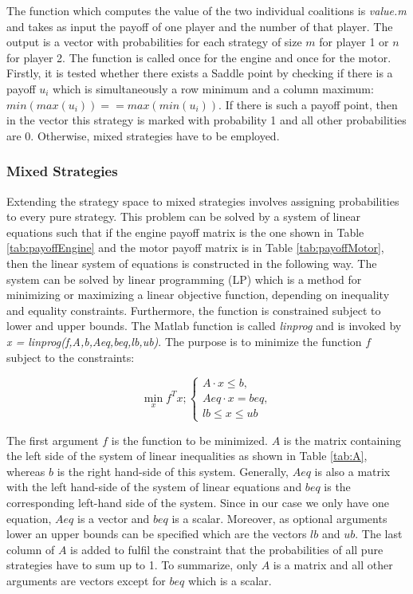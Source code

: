 The function which computes the value of the two individual coalitions is \textit{value.m} and takes as input the payoff of one player and the number of that player. The output is a vector with probabilities for each strategy of size $m$ for player 1 or $n$ for player 2. The function is called once for the engine and once for the motor. Firstly, it is tested whether there exists a Saddle point by checking if there is a payoff $u_i$ which is simultaneously a row minimum and a column maximum: $min(max(u_i)) == max(min(u_i))$. If there is such a payoff point, then in the vector this strategy is marked with probability 1 and all other probabilities are 0. Otherwise, mixed strategies have to be employed. 

\subsubsection{Mixed Strategies}

Extending the strategy space to mixed strategies involves assigning probabilities to every pure strategy. This problem can be solved by a system of linear equations such that if the engine payoff matrix is the one shown in Table \ref{tab:payoffEngine} and the motor payoff matrix is in Table \ref{tab:payoffMotor}, then the linear system of equations is constructed in the following way. The system can be solved by linear programming (LP) which is a method for minimizing or maximizing a linear objective function, depending on inequality and equality constraints. Furthermore, the function is constrained subject to lower and upper bounds. The Matlab function is called \textit{linprog} and is invoked by \textit{x = linprog(f,A,b,Aeq,beq,lb,ub)}. The purpose is to minimize the function $f$ subject to the constraints:

\begin{equation}
\min_x f^Tx ; \left\{
                \begin{array}{ll}
                  A \cdot x \leq b,\\
                  Aeq \cdot x = beq,\\
                  lb \leq x \leq ub
                \end{array}
              \right.
\end{equation}

The first argument $f$ is the function to be minimized. $A$ is the matrix containing the left side of the system of linear inequalities as shown in Table \ref{tab:A}, whereas $b$ is the right hand-side of this system. Generally, $Aeq$ is also a matrix with the left hand-side of the system of linear equations and $beq$ is the corresponding left-hand side of the system. Since in our case we only have one equation, $Aeq$ is a vector and $beq$ is a scalar. Moreover, as optional arguments lower an upper bounds can be specified which are the vectors $lb$ and $ub$. The last column of $A$ is added to fulfil the constraint that the probabilities of all pure strategies have to sum up to 1. To summarize, only $A$ is a matrix and all other arguments are vectors except for $beq$ which is a scalar.

